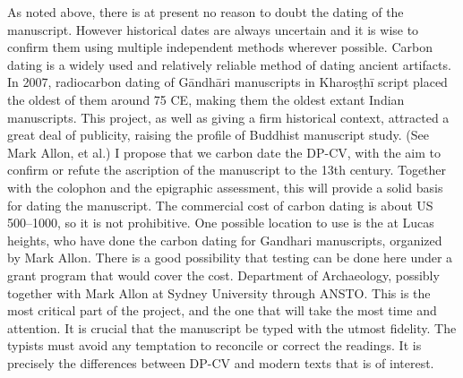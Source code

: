 \markdownRendererBlockQuoteEnd \markdownRendererInterblockSeparator
{}\markdownRendererInterblockSeparator
{}As noted above, there is at present no reason to doubt the dating of the manuscript. However historical dates are always uncertain and it is wise to confirm them using multiple independent methods wherever possible. Carbon dating is a widely used and relatively reliable method of dating ancient artifacts.\markdownRendererInterblockSeparator
{}In 2007, radiocarbon dating of Gāndhāri manuscripts in Kharoṣṭhī script placed the oldest of them around 75 CE, making them the oldest extant Indian manuscripts. This project, as well as giving a firm historical context, attracted a great deal of publicity, raising the profile of Buddhist manuscript study. (See Mark Allon, et al.)\markdownRendererInterblockSeparator
{}I propose that we carbon date the DP-CV, with the aim to confirm or refute the ascription of the manuscript to the 13th century. Together with the colophon and the epigraphic assessment, this will provide a solid basis for dating the manuscript.\markdownRendererInterblockSeparator
{}The commercial cost of carbon dating is about US \markdownRendererDollarSign{}500–\markdownRendererDollarSign{}1000, so it is not prohibitive. One possible location to use is the  at Lucas heights, who have done the carbon dating for Gandhari manuscripts, organized by Mark Allon. There is a good possibility that testing can be done here under a grant program that would cover the cost.\markdownRendererInterblockSeparator
{}\markdownRendererBlockQuoteBegin
{} Department of Archaeology, possibly together with Mark Allon at Sydney University through ANSTO.
\markdownRendererBlockQuoteEnd \markdownRendererInterblockSeparator
{}\markdownRendererInterblockSeparator
{}This is the most critical part of the project, and the one that will take the most time and attention. It is crucial that the manuscript be typed with the utmost fidelity. The typists must avoid any temptation to reconcile or correct the readings. It is precisely the differences between DP-CV and modern texts that is of interest.\markdownRendererInterblockSeparator
